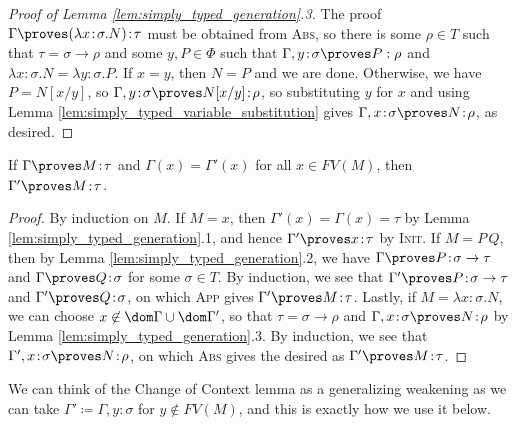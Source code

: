 \documentclass[reqno]{amsart}
\begin{document}
    \begin{proof}[Proof of Lemma \ref{lem:simply_typed_generation}.3]
        The proof $\Gamma\proves(\lambda x\!:\!\sigma.N)\!:\!\tau$ must be obtained from \textsc{Abs}, so there is some $\rho\in T$ such that $\tau=\sigma\rightarrow\rho$ and some $y,P\in\Phi$ such that $\Gamma,y\!:\!\sigma\proves P:\rho$ and $\lambda x\!:\!\sigma.N=\lambda y\!:\!\sigma.P$. If $x=y$, then $N=P$ and we are done. Otherwise, we have $P=N[x/y]$, so $\Gamma,y\!:\!\sigma\proves N[x/y]\!:\!\rho$, so substituting $y$ for $x$ and using Lemma \ref{lem:simply_typed_variable_substitution} gives $\Gamma,x\!:\!\sigma\proves N\!:\!\rho$, as desired.
    \end{proof}

    \begin{lemma}\label{lem:simply_typed_change_of_context}
        If $\Gamma\proves M\!:\!\tau$ and $\Gamma(x)=\Gamma'(x)$ for all $x\in FV(M)$, then $\Gamma'\proves M\!:\!\tau$.
    \end{lemma}
    \begin{proof}
        By induction on $M$. If $M=x$, then $\Gamma'(x)=\Gamma(x)=\tau$ by Lemma \ref{lem:simply_typed_generation}.1, and hence $\Gamma'\proves x\!:\!\tau$ by \textsc{Init}. If $M=P\,Q$, then by Lemma \ref{lem:simply_typed_generation}.2, we have $\Gamma\proves P\!:\!\sigma\rightarrow\tau$ and $\Gamma\proves Q\!:\!\sigma$ for some $\sigma\in T$. By induction, we see that $\Gamma'\proves P\!:\!\sigma\to\tau$ and $\Gamma'\proves Q\!:\!\sigma$, on which \textsc{App} gives $\Gamma'\proves M\!:\!\tau$. Lastly, if $M=\lambda x\!:\!\sigma.N$, we can choose $x\not\in\dom\Gamma\cup\dom\Gamma'$, so that $\tau=\sigma\rightarrow\rho$ and $\Gamma,x\!:\!\sigma\proves N\!:\!\rho$ by Lemma \ref{lem:simply_typed_generation}.3. By induction, we see that $\Gamma',x\!:\!\sigma\proves N\!:\!\rho$, on which \textsc{Abs} gives the desired as $\Gamma'\proves M\!:\!\tau$.
    \end{proof}

    We can think of the Change of Context lemma as a generalizing weakening as we can take $\Gamma'\coloneqq\Gamma,y\!:\!\sigma$ for $y\not\in FV(M)$, and this is exactly how we use it below.
\end{document}
